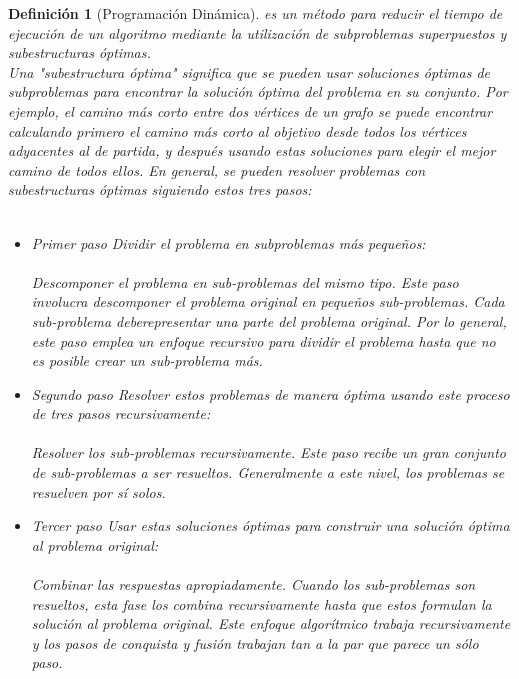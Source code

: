 \documentclass[12pt,twoside]{article}
\newtheorem{defi}{Definición}
\begin{document}
\begin{defi}[Programación Dinámica]
es un método para reducir el tiempo de ejecución de un algoritmo mediante la utilización de subproblemas superpuestos y subestructuras óptimas.
\\
Una "subestructura óptima" significa que se pueden usar soluciones óptimas de subproblemas para encontrar la solución óptima del problema en su conjunto. Por ejemplo, el camino más corto entre dos vértices de un grafo se puede encontrar calculando primero el camino más corto al objetivo desde todos los vértices adyacentes al de partida, y después usando estas soluciones para elegir el mejor camino de todos ellos. En general, se pueden resolver problemas con subestructuras óptimas siguiendo estos tres pasos:
\\
\\
\begin{itemize}
\item Primer paso Dividir el problema en subproblemas más pequeños:
\\
\\
Descomponer el problema en sub-problemas del mismo tipo. Este paso involucra descomponer el problema original en pequeños sub-problemas. Cada sub-problema deberepresentar una parte del problema original. Por lo general, este paso emplea un enfoque recursivo para dividir el problema hasta que no es posible crear un sub-problema más.
\\
\item Segundo paso Resolver estos problemas de manera óptima usando este proceso de tres pasos recursivamente:
\\
\\
Resolver los sub-problemas recursivamente. Este paso recibe un gran conjunto de sub-problemas a ser resueltos. Generalmente a este nivel, los problemas se resuelven por sí solos.
\\
\item Tercer paso Usar estas soluciones óptimas para construir una solución óptima al problema original:
\\
\\
Combinar las respuestas apropiadamente. Cuando los sub-problemas son resueltos, esta fase los combina recursivamente hasta que estos formulan la solución al problema original. Este enfoque algorítmico trabaja recursivamente y los pasos de conquista y fusión trabajan tan a la par que parece un sólo paso.
\\
\end{itemize} 
\\
\end{defi}
\newpage
\end{document}
